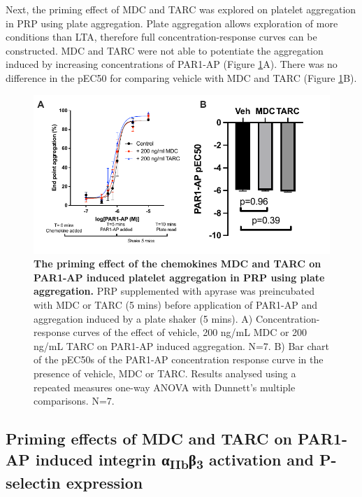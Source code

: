 \documentclass[11pt,twoside]{bristolthesis}
\begin{document}
Next, the priming effect of MDC and TARC was explored on platelet aggregation in PRP using plate aggregation. Plate aggregation allows exploration of more conditions than LTA, therefore full concentration-response curves can be constructed. MDC and TARC were not able to potentiate the aggregation induced by increasing concentrations of PAR1-AP (Figure \ref{fig:MDC-TARC-agg-PRP}A). There was no difference in the pEC50 for comparing vehicle with MDC and TARC (Figure \ref{fig:MDC-TARC-agg-PRP}B).



\begin{figure}
\includegraphics{figure/Chemokines/Layouts/MDC_TARC_PRP_plate_agg} \caption[The priming effect of the chemokines MDC and TARC on PAR1-AP induced platelet aggregation in PRP using plate aggregation]{\textbf{The priming effect of the chemokines MDC and TARC on PAR1-AP induced platelet aggregation in PRP using plate aggregation.} PRP supplemented with apyrase was preincubated with MDC or TARC (5 mins) before application of PAR1-AP and aggregation induced by a plate shaker (5 mins). A) Concentration-response curves of the effect of vehicle, 200 ng/mL MDC or 200 ng/mL TARC on PAR1-AP induced aggregation. N=7. B) Bar chart of the pEC50s of the PAR1-AP concentration response curve in the presence of vehicle, MDC or TARC. Results analysed using a repeated measures one-way ANOVA with Dunnett's multiple comparisons. N=7.}\label{fig:MDC-TARC-agg-PRP}
\end{figure}
\hypertarget{priming-effects-of-mdc-and-tarc-on-par1-ap-induced-integrin-ux3b1iibux3b23-activation-and-p-selectin-expression}{%
\subsection{\texorpdfstring{Priming effects of MDC and TARC on PAR1-AP induced integrin α\textsubscript{IIb}β\textsubscript{3} activation and P-selectin expression}{Priming effects of MDC and TARC on PAR1-AP induced integrin αIIbβ3 activation and P-selectin expression}}\label{priming-effects-of-mdc-and-tarc-on-par1-ap-induced-integrin-ux3b1iibux3b23-activation-and-p-selectin-expression}}
\end{document}
